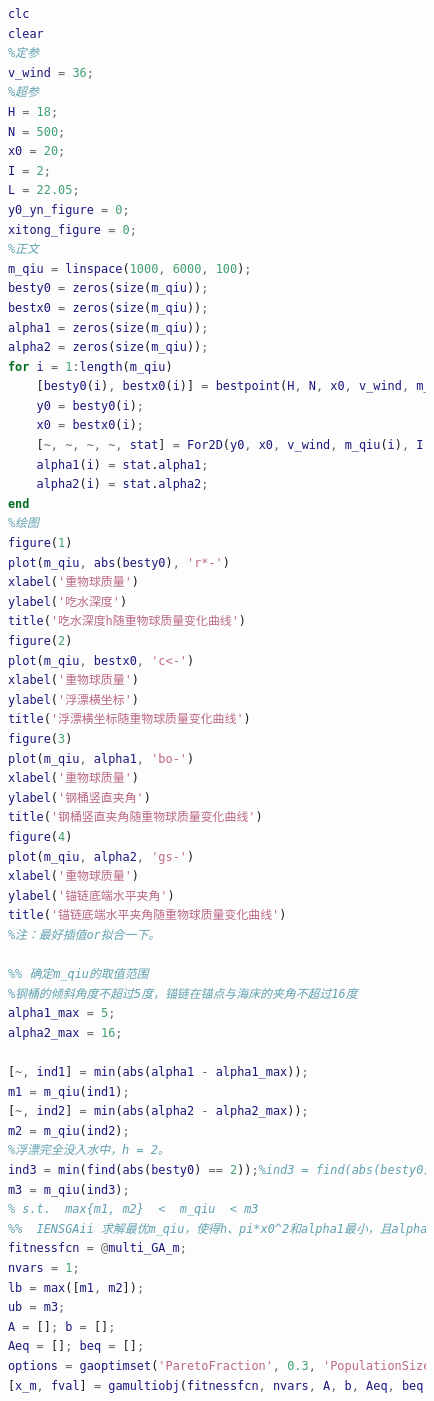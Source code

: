 \documentclass[UTF8]{ctexbook}
\theoremstyle{nonumberplain}
\begin{document}
            \begin{lstlisting}[language = Matlab]
            %% 绘制m_qiu和y0 、x0 、alpha1、alpha2之间的关系图
            clc
            clear
            %定参
            v_wind = 36;
            %超参
            H = 18;
            N = 500;
            x0 = 20;
            I = 2;
            L = 22.05;
            y0_yn_figure = 0;
            xitong_figure = 0;
            %正文
            m_qiu = linspace(1000, 6000, 100);
            besty0 = zeros(size(m_qiu));
            bestx0 = zeros(size(m_qiu));
            alpha1 = zeros(size(m_qiu));
            alpha2 = zeros(size(m_qiu));
            for i = 1:length(m_qiu)
                [besty0(i), bestx0(i)] = bestpoint(H, N, x0, v_wind, m_qiu(i), I, L, y0_yn_figure);
                y0 = besty0(i);
                x0 = bestx0(i);
                [~, ~, ~, ~, stat] = For2D(y0, x0, v_wind, m_qiu(i), I, L, xitong_figure);
                alpha1(i) = stat.alpha1;
                alpha2(i) = stat.alpha2;
            end
            %绘图
            figure(1)
            plot(m_qiu, abs(besty0), 'r*-')
            xlabel('重物球质量')
            ylabel('吃水深度')
            title('吃水深度h随重物球质量变化曲线')
            figure(2)
            plot(m_qiu, bestx0, 'c<-')
            xlabel('重物球质量')
            ylabel('浮漂横坐标')
            title('浮漂横坐标随重物球质量变化曲线')
            figure(3)
            plot(m_qiu, alpha1, 'bo-')
            xlabel('重物球质量')
            ylabel('钢桶竖直夹角')
            title('钢桶竖直夹角随重物球质量变化曲线')
            figure(4)
            plot(m_qiu, alpha2, 'gs-')
            xlabel('重物球质量')
            ylabel('锚链底端水平夹角')
            title('锚链底端水平夹角随重物球质量变化曲线')
            %注：最好插值or拟合一下。

            %% 确定m_qiu的取值范围
            %钢桶的倾斜角度不超过5度，锚链在锚点与海床的夹角不超过16度
            alpha1_max = 5;
            alpha2_max = 16;

            [~, ind1] = min(abs(alpha1 - alpha1_max));
            m1 = m_qiu(ind1);
            [~, ind2] = min(abs(alpha2 - alpha2_max));
            m2 = m_qiu(ind2);
            %浮漂完全没入水中，h = 2。
            ind3 = min(find(abs(besty0) == 2));%ind3 = find(abs(besty0) == 2, 1)
            m3 = m_qiu(ind3);
            % s.t.  max{m1, m2}  <  m_qiu  < m3
            %%  IENSGAii 求解最优m_qiu，使得h、pi*x0^2和alpha1最小，且alpha1，2在范围内
            fitnessfcn = @multi_GA_m;
            nvars = 1;
            lb = max([m1, m2]);
            ub = m3;
            A = []; b = [];
            Aeq = []; beq = [];
            options = gaoptimset('ParetoFraction', 0.3, 'PopulationSize', 100, 'Generations', 100, 'StallGenLimit', 100, 'PlotFcns', {@gaplotpareto, @gaplotbestf});
            [x_m, fval] = gamultiobj(fitnessfcn, nvars, A, b, Aeq, beq, lb, ub, options);
            \end{lstlisting}
\end{document}
